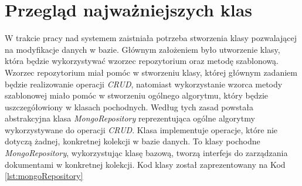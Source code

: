 \documentclass[a4paper,twoside,12pt]{book}
\begin{document}
\section{Przegląd najważniejszych klas}
W trakcie pracy nad systemem zaistniała potrzeba stworzenia klasy pozwalającej na modyfikacje danych w bazie. Głównym założeniem było utworzenie klasy, która będzie wykorzystywać wzorzec repozytorium oraz metodę szablonową. Wzorzec repozytorium miał pomóc w stworzeniu klasy, której głównym zadaniem będzie realizowanie operacji \textit{CRUD}, natomiast wykorzystanie wzorca metody szablonowej miało pomóc w stworzeniu ogólnego algorytmu, który będzie uszczegółowiony w klasach pochodnych. Według tych zasad powstała abstrakcyjna klasa \textit{MongoRepository} reprezentująca ogólne algorytmy wykorzystywane do operacji \textit{CRUD}. Klasa implementuje operacje, które nie dotyczą żadnej, konkretnej kolekcji w bazie danych. To klasy pochodne \textit{MongoRepository}, wykorzystując klasę bazową, tworzą interfejs do zarządzania dokumentami w konkretnej kolekcji. Kod klasy został zaprezentowany na Kod \ref{lst:mongoRepository}
\end{document}
